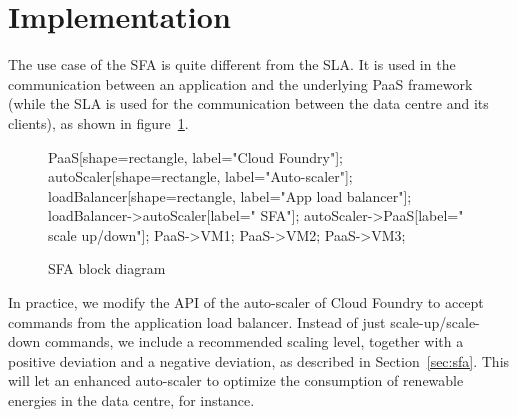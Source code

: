 \section{Implementation}
\label{sec:implem}

The use case of the SFA is quite different from the SLA. 
It is used in the communication between an application and the underlying PaaS framework (while the SLA is used for the communication between the data centre and its clients), as shown in figure~\ref{fig:SFABlock}.

\begin{figure}[h]
\label{fig:SFABlock}
\centering
\caption{SFA block diagram}
{
   PaaS[shape=rectangle, label="Cloud Foundry"];
   autoScaler[shape=rectangle, label="Auto-scaler"];
   loadBalancer[shape=rectangle, label="App load balancer"];
   loadBalancer->autoScaler[label=" SFA"];
   autoScaler->PaaS[label=" scale up/down"];
   PaaS->VM1;
   PaaS->VM2;
   PaaS->VM3;
}
\end{figure}

In practice, we modify the API of the auto-scaler of Cloud Foundry to accept commands from the application load balancer.
Instead of just scale-up/scale-down commands, we include a recommended scaling level, together with a positive deviation and a negative deviation, as described in Section~\ref{sec:sfa}.
This will let an enhanced auto-scaler to optimize the consumption of renewable energies in the data centre, for instance.